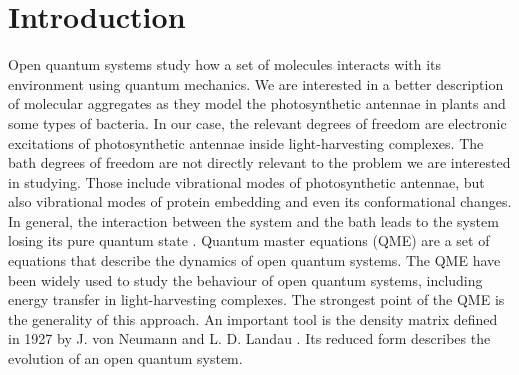\chapter*{Introduction}

Open quantum systems study how a set of molecules interacts with its environment using quantum mechanics.  We are interested in a better description of molecular aggregates as they model the photosynthetic antennae in plants and some types of bacteria. In our case, the relevant degrees of freedom are electronic excitations of photosynthetic antennae inside light-harvesting complexes. The bath degrees of freedom are not directly relevant to the problem we are interested in studying. Those include vibrational modes of photosynthetic antennae, but also vibrational modes of protein embedding and even its conformational changes. In general, the interaction between the system and the bath leads to the system losing its pure quantum state \cite{cao_quantum_2020} \cite{mancal_decade_2020}. Quantum master equations (QME) \cite{Valkunas2013-op} are a set of equations that describe the dynamics of open quantum systems. The QME have been widely used to study the behaviour of open quantum systems, including energy transfer in light-harvesting complexes. The strongest point of the QME is the generality of this approach. An important tool is the density matrix defined in 1927 by J. von Neumann  \cite{neumann_wahrscheinlichkeitstheoretischer_1927} and L. D. Landau \cite{Landau1927}. Its reduced form describes the evolution of an open quantum system. 

